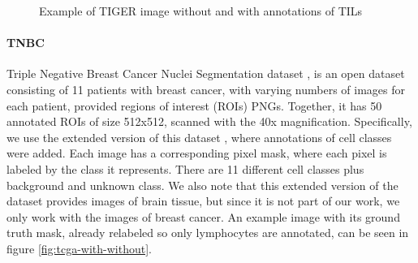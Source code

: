 \begin{figure}[H]
\begin{subfigure}[b]{0.32\textwidth}
    \label{fig:tiger-bbox}
  \end{subfigure}%
  \caption{Example of TIGER image without and with annotations of TILs \cite{tiger_dataset}}
  \label{fig:tiger-with-without}
\end{figure}

\paragraph{TNBC} Triple Negative Breast Cancer Nuclei Segmentation dataset \cite{TNBC-nuclei-seg}, is an open dataset consisting of 11 patients with breast cancer, with varying numbers of images for each patient, provided regions of interest (ROIs) PNGs. Together, it has 50 annotated ROIs of size 512x512, scanned with the 40x magnification. Specifically, we use the extended version of this dataset \cite{TNBC-nuclei-seg-extended}, where annotations of cell classes were added. Each image has a corresponding pixel mask, where each pixel is labeled by the class it represents. There are 11 different cell classes plus background and unknown class. We also note that this extended version of the dataset provides images of brain tissue, but since it is not part of our work, we only work with the images of breast cancer. An example image with its ground truth mask, already relabeled so only lymphocytes are annotated, can be seen in figure \ref{fig:tcga-with-without}.

